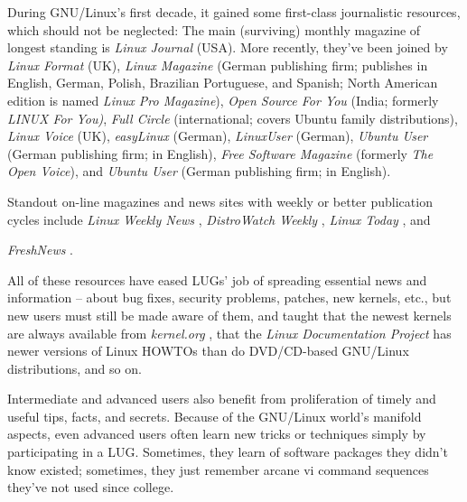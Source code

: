 During GNU/Linux's first decade, it gained some first-class journalistic 
resources, which should not be neglected:  The main (surviving) monthly 
magazine of longest standing is {\itshape 
\emph{Linux Journal} \texttt{\acpurl}
\/} (USA).
More recently, 
they've been joined by 
{\itshape 
\emph{Linux Format} \texttt{\acqurl}
\/} (UK),
{\itshape 
\emph{Linux Magazine} \texttt{\acrurl}
\/} (German publishing firm; publishes in English, German, Polish, Brazilian Portuguese, and Spanish; North American edition is named {\itshape Linux Pro Magazine\/}),
{\itshape 
\emph{Open Source For You} \texttt{\acsurl}
\/} (India; formerly {\itshape LINUX For You)\/},
{\itshape 
\emph{Full Circle} \texttt{\acturl}
\/} (international; covers Ubuntu family distributions), 
{\itshape 
\emph{Linux Voice} \texttt{\acuurl}
\/} (UK), 
{\itshape 
\emph{easyLinux} \texttt{\acvurl}
\/} (German),
{\itshape 
\emph{LinuxUser} \texttt{\acwurl}
\/} (German), 
{\itshape 
\emph{Ubuntu User} \texttt{\acxurl}
\/} (German
publishing firm; in English), 
{\itshape 
\emph{Free Software Magazine} \texttt{\acyurl}
\/} (formerly {\itshape The Open Voice\/}), and
{\itshape 
\emph{Ubuntu User} \texttt{\aczurl}
\/} (German publishing firm; in English).

Standout on-line magazines and news sites with weekly or better publication 
cycles include {\itshape 
\emph{Linux Weekly News} \texttt{\adaurl}
\/}, 
{\itshape 
\emph{DistroWatch Weekly} \texttt{\adburl}
\/},
{\itshape 
\emph{Linux Today} \texttt{\adcurl}
\/}, and

\emph{FreshNews} \texttt{\addurl}
.

All of these resources have eased LUGs' job of spreading essential
news and information --  about bug fixes, security problems, patches, 
new kernels, etc., but new users must still be made aware of
them, and taught that the newest kernels are always
available from 
\emph{kernel.org} \texttt{\adeurl}
,
that the 
\emph{Linux Documentation Project} \texttt{\adfurl}
 has newer versions of Linux HOWTOs than do DVD/CD-based GNU/Linux
distributions, and so on.

Intermediate and advanced users also benefit from proliferation of
timely and useful tips, facts, and secrets. Because of the GNU/Linux
world's manifold aspects, even advanced users often learn new tricks or
techniques simply by participating in a LUG. Sometimes, they learn of
software packages they didn't know existed; sometimes, they just
remember arcane {\ttfamily vi} command sequences they've not used since
college.




